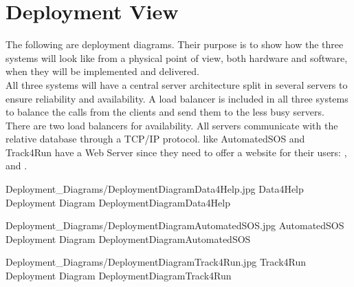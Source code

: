 \documentclass[../../DD.tex]{subfiles}
\begin{document}
\section{Deployment View}
	
	\indent The following are deployment diagrams. Their purpose is to show how the three systems will look like from a physical point of view, both hardware and software, when they will be implemented and delivered.\\
	\indent All three systems will have a central server architecture split in several servers to ensure reliability and availability. A load balancer is included in all three systems to balance the calls from the clients and send them to the less busy servers. There are two load balancers for availability. All servers communicate with the relative database through a TCP/IP protocol.  like AutomatedSOS and Track4Run have a Web Server since they need to offer a website for their users: ,  and .

	\image {13cm} {Deployment_Diagrams/DeploymentDiagramData4Help.jpg} {Data4Help Deployment Diagram} {DeploymentDiagramData4Help}

	\image {13cm} {Deployment_Diagrams/DeploymentDiagramAutomatedSOS.jpg} {AutomatedSOS Deployment Diagram} {DeploymentDiagramAutomatedSOS}

	\image {13cm} {Deployment_Diagrams/DeploymentDiagramTrack4Run.jpg} {Track4Run Deployment Diagram} {DeploymentDiagramTrack4Run}
	
\end{document}
